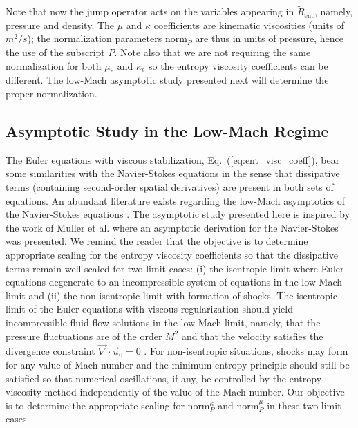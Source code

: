 \documentclass[preprint,10pt]{elsarticle}
\renewcommand{\div}{\vec{\nabla}\! \cdot \!}
\newcommand{\norm}{\textrm{norm}}
\renewcommand{\Re}{\textrm{Re}}
\newcommand{\Pe}{\textrm{P\'e}}
\newcommand{\resinew}{\widetilde{R}_\text{ent}}
\newcommand{\eqt}[1]{Eq.~(\ref{#1})}                     %
\newcommand{\tcb}[1]{\textcolor{blue}{#1}}
\begin{document}
%
Note that now the jump operator acts on the variables appearing in $\resinew$, namely, pressure and density. 
The $\mu$ and $\kappa$ coefficients are kinematic viscosities (units of $m^2/s$); the normalization 
parameters $\norm_P$ are thus in units of pressure, hence the use of the subscript $P$.  Note also 
that we are not requiring the same normalization for both $\mu_e$ and $\kappa_e$ so the entropy viscosity 
coefficients can be different. The low-Mach asymptotic study presented next will determine the proper normalization.

\subsection{Asymptotic Study in the Low-Mach Regime} \label{sec:lowMach}

The Euler equations with viscous stabilization, \eqt{eq:ent_visc_coeff}, bear some similarities with 
the Navier-Stokes equations in the sense that dissipative terms (containing second-order spatial derivatives) 
are present in both sets of equations. An abundant literature exists regarding the low-Mach asymptotics 
of the Navier-Stokes equations \cite{LowMach1, LowMach2, LowMach3, Muller}.   
%
The asymptotic study presented here is inspired by the work of Muller et al. \cite{Muller} where 
an asymptotic derivation for the Navier-Stokes was presented. 
We remind the reader that the objective is to determine appropriate scaling for the entropy 
viscosity coefficients so that the dissipative terms remain well-scaled for two limit cases: 
(i) the isentropic limit where Euler equations degenerate to an incompressible system of 
equations in the low-Mach limit and 
(ii) the non-isentropic limit with formation of shocks. 
The isentropic limit of the Euler equations with viscous regularization should yield incompressible 
fluid flow solutions in the low-Mach limit, namely, that the pressure fluctuations are of the 
order $M^2$ and that the velocity satisfies the divergence constraint $\div \vec{u}_0 = 0$ 
\cite{LowMach1, LowMach2, LowMach3}. For non-isentropic situations, shocks may form for any 
value of Mach number and the minimum entropy principle should still be satisfied so that numerical 
oscillations, if any, be controlled by the entropy viscosity method independently of the value of the Mach number.
Our objective is to determine the appropriate scaling for $\norm_P^\kappa$ and $\norm_P^\mu$ in these two limit cases.
\end{document}
